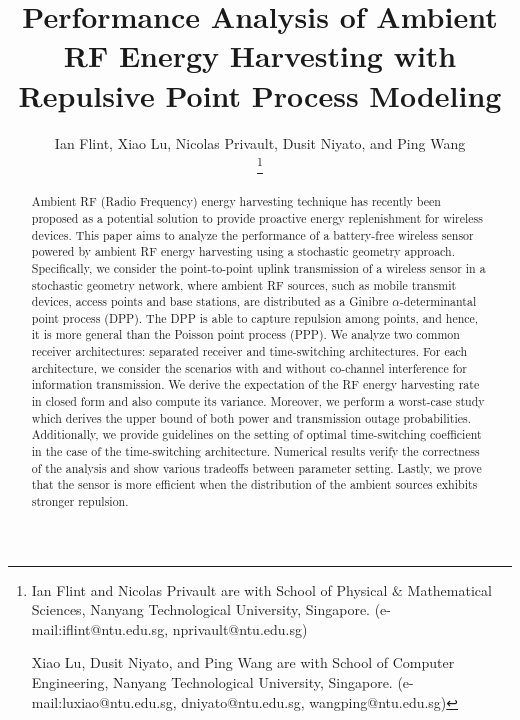\documentclass[12pt,draftclsnofoot,onecolumn]{IEEEtran}
\begin{document}
 
\title{Performance Analysis of Ambient RF Energy Harvesting with Repulsive Point Process Modeling} 

\author{Ian Flint, Xiao Lu, Nicolas Privault, Dusit Niyato, and Ping Wang	\\
\thanks{Ian Flint and Nicolas Privault are with School of Physical $\&$ Mathematical Sciences, Nanyang Technological University, Singapore. (e-mail:iflint@ntu.edu.sg, nprivault@ntu.edu.sg) 
    
Xiao Lu, Dusit Niyato, and Ping Wang are with School of Computer Engineering, Nanyang Technological University, Singapore. (e-mail:luxiao@ntu.edu.sg, dniyato@ntu.edu.sg, wangping@ntu.edu.sg)}
} 
 



\maketitle

\vspace{-20mm}

\begin{abstract}
Ambient RF (Radio Frequency) energy harvesting technique has recently been proposed as a potential solution to provide proactive energy replenishment for wireless devices. This paper aims to analyze the performance of a battery-free wireless sensor powered by ambient RF energy harvesting using a stochastic geometry approach. Specifically, we consider the point-to-point uplink transmission of a wireless sensor in a stochastic geometry network, where ambient RF sources, such as mobile transmit devices, access points and base stations, are distributed as a Ginibre $\alpha$-determinantal point process (DPP). The DPP is able to capture repulsion among points, and hence, it is more general than the Poisson point process (PPP). We analyze two common receiver architectures: separated receiver and time-switching architectures. For each architecture, we consider the scenarios with and without co-channel interference for information transmission. We derive the expectation of the RF energy harvesting rate in closed form and also compute its variance. Moreover, we perform a worst-case study which derives the upper bound of both power and transmission outage probabilities. Additionally, we provide guidelines on the setting of optimal time-switching coefficient in the case of the time-switching architecture. Numerical results verify the correctness of the analysis and show  various tradeoffs between parameter setting. Lastly, we prove that the sensor is more efficient when the distribution of the ambient sources exhibits stronger repulsion. 

\end{abstract}
\end{document}

